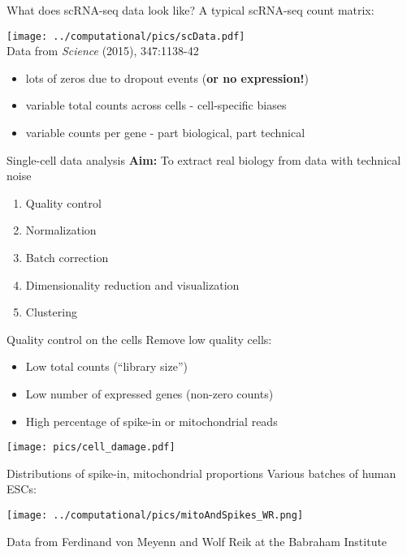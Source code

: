 \documentclass{beamer}
\begin{document}
\begin{frame}{What does scRNA-seq data look like?}
A typical scRNA-seq count matrix:
\begin{center}
\texttt{[image: ../computational/pics/scData.pdf]} \\
\vspace{-.1in}
{\tiny Data from \textit{Science} (2015), 347:1138-42}
\end{center}
\begin{itemize}
\item lots of zeros due to dropout events (\textbf{or no expression!})
\item variable total counts across cells - cell-specific biases
\item variable counts per gene - part biological, part technical
\end{itemize}
\end{frame}

\begin{frame}{Single-cell data analysis}
\textbf{Aim:} To extract real biology from data with technical noise
\begin{enumerate}
\item Quality control
\item Normalization 
\item Batch correction
\item Dimensionality reduction and visualization
\item Clustering
\end{enumerate}
\end{frame}

\begin{frame}{Quality control on the cells}
Remove low quality cells:
\begin{itemize}
\item Low total counts (``library size'') 
\item Low number of expressed genes (non-zero counts) 
\item High percentage of spike-in or mitochondrial reads 
\end{itemize}
\pause
\begin{center}
\texttt{[image: pics/cell\_damage.pdf]}
\end{center}
\end{frame}

\begin{frame}{Distributions of spike-in, mitochondrial proportions}
Various batches of human ESCs:
\begin{center}
\texttt{[image: ../computational/pics/mitoAndSpikes\_WR.png]}
\end{center}
{\tiny Data from Ferdinand von Meyenn and Wolf Reik at the Babraham Institute}
\end{frame}
\end{document}
